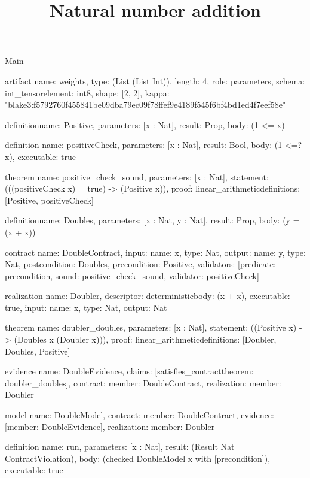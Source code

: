 \begin{lexlean}{Main}
\title{Natural number addition}
\begin{semanticmodule}
artifact{
  name: weights,
  type: (List (List Int)),
  length: 4,
  role: parameters,
  schema: int_tensor{element: int8, shape: [2, 2]},
  kappa: "blake3:f5792760f455841be09dba79ec09f78ffef9e4189f545f6bf4bd1ed4f7eef58e"
}

definition{name: Positive, parameters: [x : Nat], result: Prop, body: (1 <= x)}

definition{
  name: positiveCheck,
  parameters: [x : Nat],
  result: Bool,
  body: (1 <=? x),
  executable: true
}

theorem{
  name: positive_check_sound,
  parameters: [x : Nat],
  statement: (((positiveCheck x) = true) -> (Positive x)),
  proof: linear_arithmetic{definitions: [Positive, positiveCheck]}
}

definition{name: Doubles, parameters: [x : Nat, y : Nat], result: Prop, body: (y = (x + x))}

contract{
  name: DoubleContract,
  input: {name: x, type: Nat},
  output: {name: y, type: Nat},
  postcondition: Doubles,
  precondition: Positive,
  validators: [{predicate: precondition, sound: positive_check_sound, validator: positiveCheck}]
}

realization{
  name: Doubler,
  descriptor: deterministic{body: (x + x)},
  executable: true,
  input: {name: x, type: Nat},
  output: Nat
}

theorem{
  name: doubler_doubles,
  parameters: [x : Nat],
  statement: ((Positive x) -> (Doubles x (Doubler x))),
  proof: linear_arithmetic{definitions: [Doubler, Doubles, Positive]}
}

evidence{
  name: DoubleEvidence,
  claims: [satisfies_contract{theorem: doubler_doubles}],
  contract: {member: DoubleContract},
  realization: {member: Doubler}
}

model{
  name: DoubleModel,
  contract: {member: DoubleContract},
  evidence: [{member: DoubleEvidence}],
  realization: {member: Doubler}
}

definition{
  name: run,
  parameters: [x : Nat],
  result: (Result Nat ContractViolation),
  body: (checked DoubleModel x with [precondition]),
  executable: true
}
\end{semanticmodule}
\end{lexlean}
